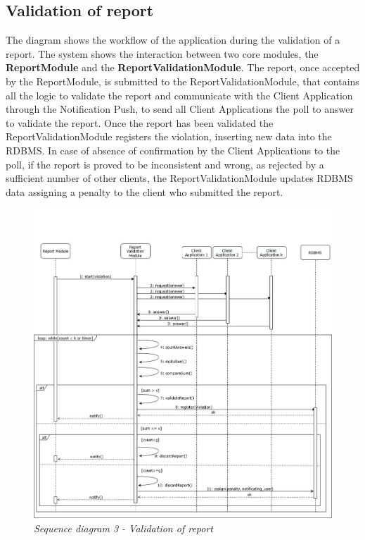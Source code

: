 \subsection{Validation of report}
The diagram shows the workflow of the application during the validation of a report. The system shows the interaction between two core 
modules, the \textbf{ReportModule} and the \textbf{ReportValidationModule}. The report, once accepted by the ReportModule, is submitted to
the ReportValidationModule, that contains all the logic to validate the report and communicate with the Client Application through the Notification
Push, to send all Client Applications the poll to answer to validate the report. Once the report has been validated the ReportValidationModule
registers the violation, inserting new data into the RDBMS. In case of absence of confirmation by the Client Applications to the poll, if the 
report is proved to be inconsistent and wrong, as rejected by a sufficient number of other clients, the ReportValidationModule updates RDBMS data 
assigning a penalty to the client who submitted the report.

\begin{figure}[H]
  \centering
  \includegraphics[width=\textwidth]{DD_Images/RunTimeView/3.jpg}
  \caption{\textit{Sequence diagram 3 - Validation of report}}
\end{figure}

